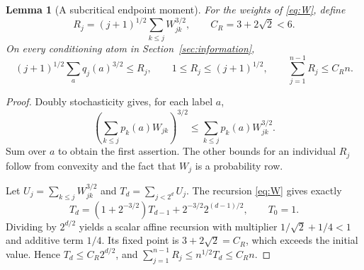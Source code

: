 \documentclass[11pt]{article}
\numberwithin{equation}{section}
\newtheorem{lemma}[theorem]{Lemma}
\theoremstyle{definition}\newtheorem{definition}[theorem]{Definition}
\theoremstyle{remark}\newtheorem{remark}[theorem]{Remark}
\begin{document}
\begin{lemma}[A subcritical endpoint moment]\label{lem:W-moment}
For the weights of \eqref{eq:W}, define
\[
 R_j=(j+1)^{1/2}\sum_{k\le j}W_{jk}^{3/2},
 \qquad C_R=3+2\sqrt2<6.
\]
On every conditioning atom in Section~\ref{sec:information},
\begin{equation}\label{eq:qmoment}
 (j+1)^{1/2}\sum_a q_j(a)^{3/2}\le R_j,
 \qquad 1\le R_j\le(j+1)^{1/2},
 \qquad \sum_{j=1}^{n-1}R_j\le C_Rn.
\end{equation}
\end{lemma}
\begin{proof}
Doubly stochasticity gives, for each label $a$,
\[
 \left(\sum_{k\le j}p_k(a)W_{jk}\right)^{3/2}
 \le\sum_{k\le j}p_k(a)W_{jk}^{3/2}.
\]
Sum over $a$ to obtain the first assertion. The other bounds for an
individual $R_j$ follow from convexity and the fact that $W_j$ is a
probability row.

Let $U_j=\sum_{k\le j}W_{jk}^{3/2}$ and $T_d=\sum_{j<2^d}U_j$.
The recursion \eqref{eq:W} gives exactly
\begin{equation}\label{eq:recurrence}
 T_d=(1+2^{-3/2})T_{d-1}+2^{-3/2}2^{(d-1)/2},
 \qquad T_0=1.
\end{equation}
Dividing by $2^{d/2}$ yields a scalar affine recursion with multiplier
$1/\sqrt2+1/4<1$ and additive term $1/4$. Its fixed point is
$3+2\sqrt2=C_R$, which exceeds the initial value. Hence
$T_d\le C_R2^{d/2}$, and
$\sum_{j=1}^{n-1}R_j\le n^{1/2}T_d\le C_Rn$.
\end{proof}
\end{document}
